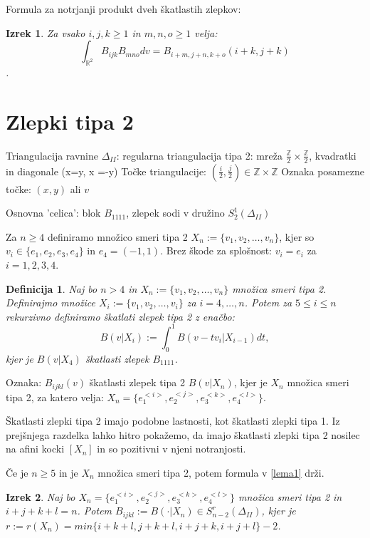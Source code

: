 \documentclass[12pt]{article}
\newtheorem{theorem}{Izrek}
\newtheorem{definition}{Definicija}
\begin{document}
Formula za notrjanji produkt dveh škatlastih zlepkov:
\begin{theorem}
Za vsako $i,j,k \geq 1$ in $m, n, o \geq 1$ velja: 
$$\int_{\mathbb{R}^2} B_{ijk} B_{mno} dv =  B_{i+m, j+n, k+o} (i+k, j+k)$$.
\end{theorem}


\section{Zlepki tipa 2}

Triangulacija ravnine $\Delta_{II}$: 
regularna triangulacija tipa 2: mreža $\frac{\mathbb{Z}}{2} \times \frac{\mathbb{Z}}{2}$, kvadratki in diagonale (x=y, x =-y)
Točke triangulacije: $(\frac{i}{2}, \frac{j}{2}) \in \mathbb{Z} \times \mathbb{Z}$
Oznaka posamezne točke: $(x,y)$ ali $v$

Osnovna 'celica': blok $B_{1111}$, zlepek sodi v družino $S_2^1 (\Delta_{II})$ 


Za $n \geq 4$ definiramo množico smeri tipa 2 $X_n := \{v_1, v_2, \ldots , v_n\}$, kjer so $v_i \in \{e_1, e_2, e_3, e_4\}$ in $e_4 = (-1, 1)$.
Brez škode za splošnost: $v_i = e_i$ za $i = 1, 2, 3, 4$.

\begin{definition}
Naj bo $n > 4$ in $X_n := \{v_1, v_2, \ldots , v_n\}$ množica smeri tipa 2.
Definirajmo množice $X_i := \{v_1, v_2, \ldots , v_i\}$ za $i = 4, \ldots, n$.
Potem za $5 \leq i \leq n$ rekurzivno definiramo škatlati zlepek tipa 2  z enačbo:
$$B(v|X_i) := \int_0^1 B(v-tv_i | X_{i-1}) dt,$$
kjer je $B(v|X_4)$ škatlasti zlepek $B_{1111}$.
\end{definition}

Oznaka: $B_{ijkl}(v)$ škatlasti zlepek tipa 2 $B(v|X_n)$, kjer je $X_n$ množica smeri tipa 2, za katero velja: $X_n = \{e_1^{<i>},e_2^{<j>}, e_3^{<k>}, e_4^{<l>}\}$.

Škatlasti zlepki tipa 2 imajo podobne lastnosti, kot škatlasti zlepki tipa 1. Iz prejšnjega razdelka lahko hitro pokažemo, da imajo škatlasti zlepki tipa 2 nosilec na afini kocki $[X_n]$  in so pozitivni v njeni notranjosti.

Če je $n \geq 5$ in je $X_n$ množica smeri tipa 2, potem formula v \ref{lema1} drži.

\begin{theorem}
Naj bo $X_n = \{e_1^{<i>},e_2^{<j>}, e_3^{<k>}, e_4^{<l>}\}$ množica smeri tipa 2 in $i+j+k+l = n$.
Potem $B_{ijkl} := B(\cdot | X_n) \in S_{n-2}^r (\Delta_{II})$, kjer je $r := r(X_n) = min\{i+k+l, j+k+l, i+j+k, i+j+l\} -2$.
\end{theorem}
\end{document}
